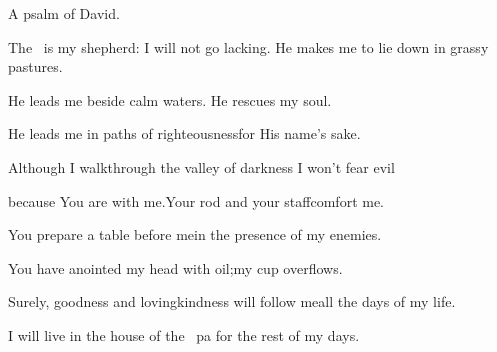 
\begin{inparaenum}
  \noindent{} A psalm of David.\smallskip%

  \pc{}The \lord\ is my shepherd: I will not go lacking.\pa{} He makes me to lie down in grassy pastures.%

  \pc{}He leads me beside calm waters.\pa{} He rescues my soul.%

  \pc{}He leads me in paths of righteousness\pa{}for His name's sake.%

  \pb{} Although I walk\pa{}through the valley of darkness%
  \pa{}I won't fear evil%

  \pc{}because You are with me.\pa{}Your rod and your staff\pa{}comfort me.%

  \pb{} You prepare a table before me\pa{}in the presence of my enemies.%

  \pc{}You have anointed my head with oil;\pa{}my cup overflows.%

  \pb{} Surely, goodness and lovingkindness%
  will follow me\pa{}all the days of my life.%

  \pc{}I will live in the house of the \lord\ pa for the rest of my days.%
\end{inparaenum}
